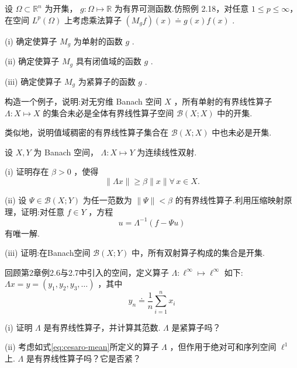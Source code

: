 \begin{rbhw}
设 $\Omega  \subset  {\mathbb{R}}^{n}$ 为开集， $g : \Omega  \mapsto  \mathbb{R}$ 为有界可测函数.仿照例 2.18，对任意 $1 \leq  p \leq  \infty$，在空间 ${L}^{p}\left( \Omega \right)$ 上考虑乘法算子 $\left( {{M}_{g}f}\right) \left( x\right)  \doteq  g\left( x\right) f\left( x\right)$ .

(i) 确定使算子 ${M}_{g}$ 为单射的函数 $g$ .

(ii) 确定使算子 ${M}_{g}$ 具有闭值域的函数 $g$ .

(iii) 确定使算子 ${M}_{g}$ 为紧算子的函数 $g$ .
\end{rbhw}

\begin{rbhw}
构造一个例子，说明:对无穷维 Banach 空间 $X$ ，所有单射的有界线性算子 $\Lambda  : X \mapsto  X$ 的集合未必是全体有界线性算子空间 $\mathcal{B}\left( {X;X}\right)$ 中的开集.

类似地，说明值域稠密的有界线性算子集合在 $\mathcal{B}\left( {X;X}\right)$ 中也未必是开集.
\end{rbhw}

\begin{rbhw}
设 $X,Y$ 为 Banach 空间， $\Lambda  : X \mapsto  Y$ 为连续线性双射.

(i) 证明存在 $\beta  > 0$ ，使得
\[
\| {\Lambda x}\|  \geq  \beta \| x\| \forall\,x \in  X.
\]

(ii) 设 $\Psi  \in  \mathcal{B}\left( {X;Y}\right)$ 为任一范数为 $\| \Psi \|  < \beta$ 的有界线性算子.利用压缩映射原理，证明:对任意 $f \in  Y$ ，方程
\[
u = {\Lambda }^{-1}\left( {f - {\Psi u}}\right)
\]
有唯一解.

(iii) 证明:在Banach空间 $\mathcal{B}\left( {X;Y}\right)$ 中，所有双射算子构成的集合是开集.
\end{rbhw}

\begin{rbhw}
回顾第2章例2.6与2.7中引入的空间，定义算子 $\Lambda  : {\ell }^{\infty } \mapsto  {\ell }^{\infty }$ 如下: ${\Lambda x} = y = \left( {{y}_{1},{y}_{2},{y}_{3},\ldots }\right)$ ，其中
\begin{equation}\tag{4.12}\label{eq:cesaro-mean}
{y}_{n} \doteq  \frac{1}{n}\mathop{\sum }\limits_{{i = 1}}^{n}{x}_{i}
\end{equation}

(i) 证明 $\Lambda$ 是有界线性算子，并计算其范数. $\Lambda$ 是紧算子吗？

(ii) 考虑如式\eqref{eq:cesaro-mean}所定义的算子 $\Lambda$ ，但作用于绝对可和序列空间 ${\ell }^{1}$ 上. $\Lambda$ 是有界线性算子吗？它是否紧？
\end{rbhw}

